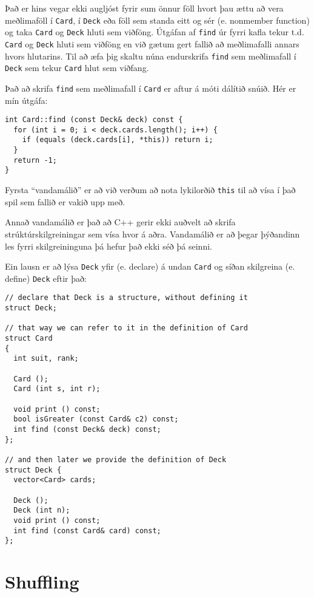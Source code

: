 Það er hins vegar ekki augljóst fyrir sum önnur föll hvort þau ættu að vera
meðlimaföll í {\tt Card}, í {\tt Deck} eða föll sem standa eitt og sér (e. nonmember function)
og taka {\tt Card} og {\tt Deck} hluti sem viðföng.
Útgáfan af {\tt find} úr fyrri kafla tekur t.d. {\tt Card} og {\tt Deck} hluti sem viðföng
en við gætum gert fallið að meðlimafalli annars hvors hlutarins. 
Til að æfa þig skaltu núna endurskrifa {\tt find} sem meðlimafall í {\tt Deck} sem tekur
{\tt Card} hlut sem viðfang. 

Það að skrifa {\tt find} sem meðlimafall í {\tt Card} er aftur á móti dálítið snúið.
Hér er mín útgáfa: 

\begin{verbatim}
int Card::find (const Deck& deck) const {
  for (int i = 0; i < deck.cards.length(); i++) {
    if (equals (deck.cards[i], *this)) return i;
  }
  return -1;
}
\end{verbatim}
%
Fyrsta ``vandamálið'' er að við verðum að nota lykilorðið {\tt this}
til að vísa í það spil sem fallið er vakið upp með.


Annað vandamálið er það að C++ gerir ekki auðvelt að skrifa strúktúrskilgreiningar
sem vísa hvor á aðra.
Vandamálið er að þegar þýðandinn les fyrri skilgreininguna þá hefur það ekki séð þá seinni.

Ein lausn er að lýsa {\tt Deck} yfir (e. declare) á undan {\tt Card} og síðan skilgreina (e. define) {\tt Deck} eftir það:

\begin{verbatim}
// declare that Deck is a structure, without defining it
struct Deck;

// that way we can refer to it in the definition of Card
struct Card
{
  int suit, rank;

  Card ();
  Card (int s, int r);

  void print () const;
  bool isGreater (const Card& c2) const;
  int find (const Deck& deck) const;
};

// and then later we provide the definition of Deck
struct Deck {
  vector<Card> cards;

  Deck ();
  Deck (int n);
  void print () const;
  int find (const Card& card) const;
};
\end{verbatim}


\section{Shuffling}
\label{shuffle}

